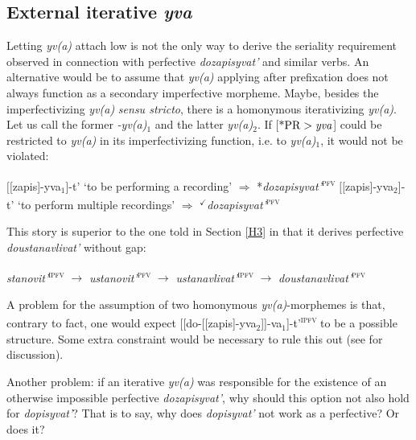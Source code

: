 \documentclass[output=paper,
colorlinks,
citecolor=brown,
newtxmath
]{langscibook}
\begin{document}

\subsection{External iterative \textit{yva}}\label{H4}

Letting \textit{yv(a)} attach low is not the only way to derive the seriality requirement observed in connection with perfective \textit{dozapisyvat'} and similar verbs. An alternative would be to assume that \textit{yv(a)} applying after prefixation does not always function as a secondary imperfective morpheme. Maybe, besides the imperfectivi\-zing  \textit{yv(a)} \textit{sensu stricto}, there is a homonymous iterativizing \textit{yv(a)}. Let us call the former \textit{-yv(a)}$_1$ and the latter \textit{yv(a)}$_2$. If [$\text{*PR}>\text{\textit{yva}}$] could be restricted to \textit{yv(a)} in its imperfectivizing function, i.e. to \textit{yv(a)}$_1$, it would not be violated:

\ea\label{poi}
\ea
$[[$zapis]-yva$_1$]-t' `to be performing a recording' $\Rightarrow$ *\textit{dozapisyvat'}\textsuperscript{\textsc{pfv}}
\ex $[[$zapis]-yva$_2$]-t' `to perform multiple recordings' $\Rightarrow$ $^{\checkmark}$\textit{dozapisyvat'}\textsuperscript{\textsc{pfv}}
\z\z

\noindent This story is superior to the one told in Section \ref{H3} in that it derives perfective \textit{doustanavlivat'} without gap:

\ea
\textit{stanovit'}\textsuperscript{\textsc{ipfv}} $\rightarrow$ \textit{ustanovit'}\textsuperscript{\textsc{pfv}} $\rightarrow$ \textit{ustanavlivat'}\textsuperscript{\textsc{ipfv}} $\rightarrow$ \textit{doustanavlivat'}\textsuperscript{\textsc{pfv}}
\z

\noindent A problem for the assumption of two homonymous \textit{yv(a)}-morphemes is that, contrary to fact, one would expect [[do-[[zapis]-yva$_2$]]-va$_1$]-t'\textsuperscript{\textsc{ipfv}} to be a possible structure. Some extra constraint would be necessary to rule this out (see \citealt[64--65]{Tatevosov2013a} for discussion).

Another problem: if an iterative \textit{yv(a)} was responsible for the existence of an otherwise impossible perfective \textit{dozapisyvat'}, why should this option not also hold for \textit{dopisyvat'}?  That is to say, why does \textit{dopisyvat'} not work as a perfective? Or does it?
\end{document}
